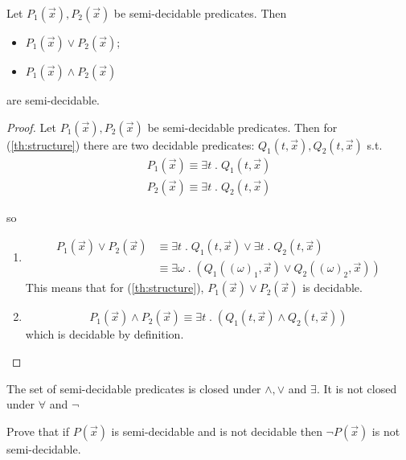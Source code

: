 \begin{theorem}
  Let $ P_1(\vec{x}), P_2(\vec{x}) $ be semi-decidable predicates. Then
  \begin{itemize}
  \item $  P_1(\vec{x}) \lor P_2(\vec{x}) $;
  \item $ P_1(\vec{x}) \land P_2(\vec{x}) $
  \end{itemize}
  are semi-decidable.

  \begin{proof}
    Let $ P_1(\vec{x}), P_2(\vec{x}) $ be semi-decidable
    predicates. Then for (\ref{th:structure}) there are two
    decidable predicates: \( Q_1(t, \vec{x}), Q_2(t, \vec{x})\) s.t.
    \begin{gather*}
      P_1(\vec{x}) \equiv \exists t \; . \; Q_1(t, \vec{x}) \\
      P_2(\vec{x}) \equiv \exists t \; . \; Q_2(t, \vec{x})
    \end{gather*}

    so
    \begin{enumerate}[label=(\arabic*)]
    \item
      \[
        \begin{split}
          P_1(\vec{x}) \lor P_2(\vec{x}) &\equiv \exists t \; . \;
          Q_1(t, \vec{x}) \lor \exists t \; . \; Q_2(t, \vec{x}) \\
          &\equiv \exists \omega \; . \; (Q_1((\omega)_1, \vec{x})
          \lor Q_2((\omega)_2, \vec{x}))
        \end{split}
      \]
      This means that for (\ref{th:structure}),
      $P_1(\vec{x}) \lor P_2(\vec{x})$ is decidable.

    \item
      \[
        P_1(\vec{x}) \land P_2(\vec{x}) \equiv \exists t \; . \;
        (Q_1(t, \vec{x}) \land Q_2(t, \vec{x}))
      \]
      which is decidable by definition.
    \end{enumerate}
  \end{proof}
\end{theorem}

\begin{observation}
  The set of semi-decidable predicates is closed under $\land, \lor$
  and $\exists$. It is not closed under $\forall$ and $\lnot$
\end{observation}

\begin{exercise}
  Prove that if $ P(\vec{x}) $ is semi-decidable and is not decidable
  then $ \lnot P(\vec{x}) $ is not semi-decidable.
\end{exercise}

